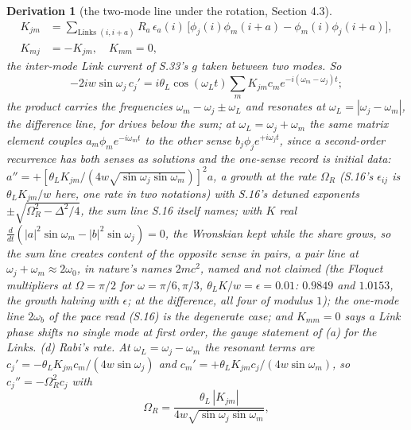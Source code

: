 \documentclass[pdflatex,sn-mathphys-num]{sn-jnl}
\theoremstyle{thmstyleone}
\newtheorem{derivation}{Derivation}
\begin{document}
\begin{derivation}[the two-mode line under the rotation, Section 4.3]
\begin{align*}
K_{jm} &= \sum_{\text{Links } (i, i+a)} R_a\,\epsilon_a(i)\,\bigl[\phi_j(i)\phi_m(i+a) - \phi_m(i)\phi_j(i+a)\bigr],\\
K_{mj} &= -K_{jm}, \quad K_{mm} = 0,
\end{align*}
the inter-mode Link current of S.33's $g$ taken between two modes. So
\[
-2iw\sin\omega_j\,c_j' = i\theta_L\cos(\omega_L t)\sum_m K_{jm}c_m e^{-i(\omega_m - \omega_j)t};
\]
the product carries the frequencies $\omega_m - \omega_j \pm \omega_L$ and resonates at $\omega_L = |\omega_j - \omega_m|$, the difference line, for drives below the sum; at $\omega_L = \omega_j + \omega_m$ the same matrix element couples $a_m\phi_m e^{-i\omega_m t}$ to the other sense $b_j\phi_j e^{+i\omega_j t}$, since a second-order recurrence has both senses as solutions and the one-sense record is initial data: $a'' = +[\theta_L K_{jm} / (4w\sqrt{\sin\omega_j\sin\omega_m})]^2 a$, a growth at the rate $\Omega_R$ (S.16's $\epsilon_{ij}$ is $\theta_L K_{jm} / w$ here, one rate in two notations) with S.16's detuned exponents $\pm\sqrt{\Omega_R^2 - \Delta^2 / 4}$, the sum line S.16 itself names; with $K$ real $\frac{d}{dt}(|a|^2\sin\omega_m - |b|^2\sin\omega_j) = 0$, the Wronskian kept while the share grows, so the sum line creates content of the opposite sense in pairs, a pair line at $\omega_j + \omega_m \approx 2\omega_0$, in nature's names $2mc^2$, named and not claimed (the Floquet multipliers at $\Omega = \pi / 2$ for $\omega = \pi / 6, \pi / 3$, $\theta_L K / w = \epsilon = 0.01$: $0.9849$ and $1.0153$, the growth halving with $\epsilon$; at the difference, all four of modulus $1$); the one-mode line $2\omega_b$ of the pace read (S.16) is the degenerate case; and $K_{mm} = 0$ says a Link phase shifts no single mode at first order, the gauge statement of (a) for the Links. (d) \emph{Rabi's rate.} At $\omega_L = \omega_j - \omega_m$ the resonant terms are $c_j' = -\theta_L K_{jm}c_m / (4w\sin\omega_j)$ and $c_m' = +\theta_L K_{jm}c_j / (4w\sin\omega_m)$, so $c_j'' = -\Omega_R^2 c_j$ with
\[
\Omega_R = \frac{\theta_L\,|K_{jm}|}{4w\sqrt{\sin\omega_j\sin\omega_m}},
\]

\end{derivation}
\end{document}
